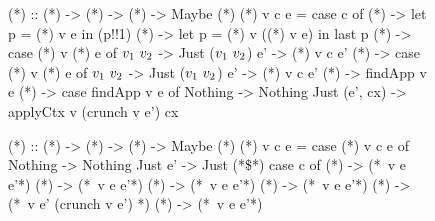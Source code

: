 \begin{figure}[t]
\begin{mcode}
(*\findExpr*) :: (*\vstate*) -> (*\cmd*) -> (*\expr*) -> Maybe (*\expr*)
(*\findExpr*) v c e = case c of
  (*\stepforwardc*) -> 
    let p = (*\getPath*) v e in (p!!1)
  (*\stepbackwardc*) -> 
    let p = (*\getPath*) v ((*\getRoot*) v e) in last p
  (*\jumpforwardc*) -> case (*\findExpr*) v (*\stepforwardc*) e of
    $v_1 \ v_2$ -> Just ($v_1 \ v_2$)
    e'   -> (*\findExpr*) v c e'
  (*\jumpbackwardc*) -> case (*\findExpr*) v (*\stepbackwardc*) e of
    $v_1 \ v_2$ -> Just ($v_1 \ v_2$)
    e'   -> (*\findExpr*) v c e'
  (*\stepintoc*) -> findApp v e
  (*\stepoverc*) -> case findApp v e of
    Nothing       -> Nothing
    Just (e', cx) -> applyCtx v (crunch v e') cx

(*\updState*) :: (*\vstate*) -> (*\cmd*) -> (*\expr*) -> Maybe (*\vstate*)
(*\updState*) v c e = case (*\findExpr*) v c e of
  Nothing -> Nothing
  Just e' -> Just (*\$*) case c of
    (*\stepforwardc*) -> (*\putAfter\ v e e'*)
    (*\stepbackwardc*)    -> (*\putBefore\ v e e'*)
    (*\jumpforwardc*) -> (*\putAfter\ v e e'*)
    (*\jumpbackwardc*)    -> (*\putBefore\ v e e'*)
    (*\stepintoc*)    -> (*\putRoot\ v e' (crunch v e') *)
    (*\stepoverc*)    -> (*\putAfter\ v e e'*)
\end{mcode}

\end{figure}
